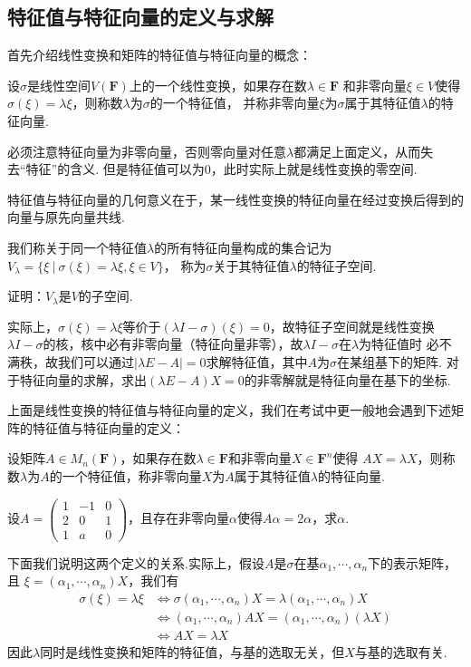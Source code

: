 \subsection{特征值与特征向量的定义与求解}
首先介绍线性变换和矩阵的特征值与特征向量的概念：
\begin{definition}
	设$\sigma$是线性空间$V(\mathbf{F})$上的一个线性变换，如果存在数$\lambda\in\mathbf{F}$
	和非零向量$\xi\in V$使得$\sigma(\xi)=\lambda\xi$，则称数$\lambda$为$\sigma$的一个特征值，
	并称非零向量$\xi$为$\sigma$属于其特征值$\lambda$的特征向量.
\end{definition}
必须注意特征向量为非零向量，否则零向量对任意$\lambda$都满足上面定义，从而失去“特征”的含义.
但是特征值可以为0，此时实际上就是线性变换的零空间.

特征值与特征向量的几何意义在于，某一线性变换的特征向量在经过变换后得到的向量与原先向量共线.

我们称关于同一个特征值$\lambda$的所有特征向量构成的集合记为$V_\lambda=\{\xi\ |\ \sigma(\xi)=\lambda\xi,\xi\in V\}$，
称为$\sigma$关于其特征值$\lambda$的特征子空间.
\begin{example}
	证明：$V_\lambda$是$V$的子空间.
\end{example}
实际上，$\sigma(\xi)=\lambda\xi$等价于$(\lambda I-\sigma)(\xi)=0$，故特征子空间就是线性变换
$\lambda I-\sigma$的核，核中必有非零向量（特征向量非零），故$\lambda I-\sigma$在$\lambda$为特征值时
必不满秩，故我们可以通过$|\lambda E-A|=0$求解特征值，其中$A$为$\sigma$在某组基下的矩阵.
对于特征向量的求解，求出$(\lambda E-A)X=0$的非零解就是特征向量在基下的坐标.

上面是线性变换的特征值与特征向量的定义，我们在考试中更一般地会遇到下述矩阵的特征值与特征向量的定义：
\begin{definition}
	设矩阵$A\in M_n(\mathbf{F})$，如果存在数$\lambda\in\mathbf{F}$和非零向量$X\in\mathbf{F}^n$使得
	$AX=\lambda X$，则称数$\lambda$为$A$的一个特征值，称非零向量$X$为$A$属于其特征值$\lambda$的特征向量.
\end{definition}
\begin{example}
	设$A=\begin{pmatrix}
		1 & -1 & 0 \\ 2 & 0 & 1 \\ 1 & a & 0
	\end{pmatrix}$，且存在非零向量$\alpha$使得$A\alpha=2\alpha$，求$\alpha$.
\end{example}
下面我们说明这两个定义的关系.实际上，假设$A$是$\sigma$在基$\alpha_1,\cdots,\alpha_n$下的表示矩阵，且
$\xi=(\alpha_1,\cdots,\alpha_n)X$，我们有
\begin{align*}
	\sigma(\xi)=\lambda\xi &\Leftrightarrow \sigma(\alpha_1,\cdots,\alpha_n)X=\lambda(\alpha_1,\cdots,\alpha_n)X \\
						   &\Leftrightarrow (\alpha_1,\cdots,\alpha_n)AX=(\alpha_1,\cdots,\alpha_n)(\lambda X) \\
						   &\Leftrightarrow AX=\lambda X
\end{align*}
因此$\lambda$同时是线性变换和矩阵的特征值，与基的选取无关，但$X$与基的选取有关.

